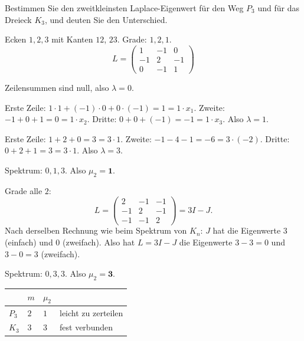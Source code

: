 \begin{aufgabe}
Bestimmen Sie den zweitkleinsten Laplace-Eigenwert für den Weg $P_3$ und für das Dreieck $K_3$, und deuten Sie den Unterschied.

\loesung
{}
Ecken $1,2,3$ mit Kanten $12$, $23$. Grade: $1, 2, 1$.
\[ L = \begin{pmatrix} 1 & -1 & 0\\ -1 & 2 & -1\\ 0 & -1 & 1 \end{pmatrix} \]

 Zeilensummen sind null, also $\lambda = 0$.

 Erste Zeile: $1 \cdot 1 + (-1)\cdot 0 + 0 \cdot (-1) = 1 = 1 \cdot x_1$. Zweite: $-1 + 0 + 1 = 0 = 1 \cdot x_2$. Dritte: $0 + 0 + (-1) = -1 = 1 \cdot x_3$. Also $\lambda = 1$.

 Erste Zeile: $1 + 2 + 0 = 3 = 3 \cdot 1$. Zweite: $-1 - 4 - 1 = -6 = 3 \cdot (-2)$. Dritte: $0 + 2 + 1 = 3 = 3\cdot 1$. Also $\lambda = 3$.

Spektrum: $0, 1, 3$. Also $\mu_2 = \mathbf{1}$.

Grade alle $2$:
\[ L = \begin{pmatrix} 2 & -1 & -1\\ -1 & 2 & -1\\ -1 & -1 & 2 \end{pmatrix} = 3I - J . \]
Nach derselben Rechnung wie beim Spektrum von $K_n$: $J$ hat die Eigenwerte $3$ (einfach) und $0$ (zweifach). Also hat $L = 3I - J$ die Eigenwerte $3 - 3 = 0$ und $3 - 0 = 3$ (zweifach).

Spektrum: $0, 3, 3$. Also $\mu_2 = \mathbf{3}$.

\begin{center}
\renewcommand{\arraystretch}{1.45}
\begin{tabular}{@{}P{1.8cm}P{1.4cm}P{1.4cm}P{3.0cm}@{}}
\toprule
& $m$ & $\mu_2$ & \\
\midrule
$P_3$ & $2$ & $1$ & leicht zu zerteilen\\
$K_3$ & $3$ & $3$ & fest verbunden\\
\bottomrule
\end{tabular}
\end{center}


\end{aufgabe}
